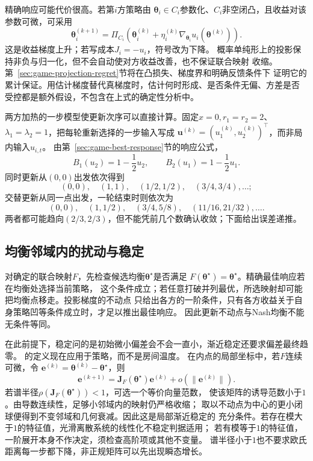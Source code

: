 精确响应可能代价很高。若第\(i\)方策略由
\(\bm\theta_i\in C_i\)参数化、\(C_i\)非空闭凸，且收益对该参数可微，可采用
\begin{equation}
  \bm\theta_i^{(k+1)}
  =\Pi_{C_i}\left(
    \bm\theta_i^{(k)}
    +\eta_i^{(k)}
    \nabla_{\bm\theta_i}u_i(\bm\theta^{(k)})
  \right).
  \label{eq:game-simultaneous-gradient}
\end{equation}
这是收益梯度上升；若写成本\(J_i=-u_i\)，符号改为下降。
概率单纯形上的投影保持非负与归一化，但不会自动使对方收益改善，也不保证联合映射
收缩。第~\ref{sec:game-projection-regret}节将在凸损失、梯度界和明确反馈条件下
证明它的累计保证。用估计梯度替代真梯度时，估计何时形成、是否条件无偏、方差是否
受控都是额外假设，不包含在上式的确定性分析中。

两方加热的一步模型使更新次序可以直接计算。固定\(x=0,r_1=r_2=2\)、
\(\lambda_1=\lambda_2=1\)，把每轮重新选择的一步输入写成
\(\bm u^{(k)}=(u_1^{(k)},u_2^{(k)})^\top\)，而非局内输入\(u_{i,t}\)。
由第~\ref{sec:game-best-response}节的响应公式，
\[
  B_1(u_2)=1-\frac12u_2,\qquad
  B_2(u_1)=1-\frac12u_1.
\]
同时更新从\((0,0)\)出发依次得到
\[
  (0,0),\quad (1,1),\quad (1/2,1/2),\quad(3/4,3/4),\ldots;
\]
交替更新从同一点出发，一轮结束时则依次为
\[
  (0,0),\quad(1,1/2),\quad(3/4,5/8),\quad(11/16,21/32),\ldots.
\]
两者都可能趋向\((2/3,2/3)\)，但不能凭前几个数确认收敛；下面给出误差递推。

\subsection{均衡邻域内的扰动与稳定}
\label{sec:game-local-stability}

对确定的联合映射\(F\)，先检查候选均衡\(\bm\theta^\star\)是否满足
\(F(\bm\theta^\star)=\bm\theta^\star\)。精确最佳响应若在均衡处选择当前策略，
这个条件成立；若任意打破并列最优，所选映射却可能把均衡点移走。投影梯度的不动点
只给出各方的一阶条件，只有各方收益关于自身策略凹等条件成立时，才足以推出最佳响应。
因此更新不动点与Nash均衡不能无条件等同。

在此前提下，稳定问的是初始微小偏差会不会一直小，渐近稳定还要求偏差最终趋零。
的定义现在应用于策略，而不是房间温度。
在内点的局部坐标中，若\(F\)连续可微，令
\(\bm e^{(k)}=\bm\theta^{(k)}-\bm\theta^\star\)，则
\[
  \bm e^{(k+1)}
  =\bm J_F(\bm\theta^\star)\bm e^{(k)}
    +o(\|\bm e^{(k)}\|).
\]
若谱半径\(\rho(\bm J_F(\bm\theta^\star))<1\)，可选一个等价向量范数，
使该矩阵的诱导范数小于\(1\)。由导数连续性，足够小邻域内的映射仍严格收缩；
取以不动点为中心的更小闭球便得到不变邻域和几何衰减。因此这是局部渐近稳定的
充分条件。若存在模大于\(1\)的特征值，光滑离散系统的线性化不稳定判据适用；
若有模等于\(1\)的特征值，一阶展开本身不作决定，须检查高阶项或其他不变量。
谱半径小于\(1\)也不要求欧氏距离每一步都下降，非正规矩阵可以先出现瞬态增长。

